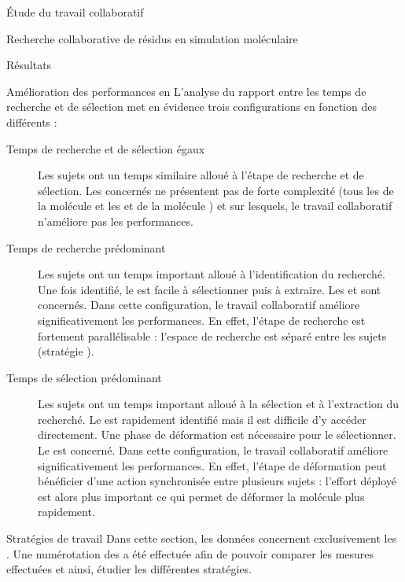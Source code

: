 \documentclass[myfrancais]{mythesis}
\begin{document}
\begin{mypart}{Étude du travail collaboratif}
\begin{mychapter}{Recherche collaborative de résidus en simulation moléculaire}
\begin{mysection}{Résultats}
\begin{mysubsection}{Amélioration des performances en }
					L'analyse du rapport entre les temps de recherche et de sélection met en évidence trois configurations en fonction des différents  :
					\begin{description}
						\item[Temps de recherche et de sélection égaux]
							Les sujets ont un temps similaire alloué à l'étape de recherche et de sélection.
							Les  concernés ne présentent pas de forte complexité (tous les  de la molécule \myTRPCAGE et les   et  de la molécule \myPrion) et sur lesquels, le travail collaboratif n'améliore pas les performances.
						\item[Temps de recherche prédominant]
							Les sujets ont un temps important alloué à l'identification du  recherché.
							Une fois identifié, le  est facile à sélectionner puis à extraire.
							Les   et  sont concernés.
							Dans cette configuration, le travail collaboratif améliore significativement les performances.
							En effet, l'étape de recherche est fortement parallélisable : l'espace de recherche est séparé entre les sujets (stratégie ).
						\item[Temps de sélection prédominant]
							Les sujets ont un temps important alloué à la sélection et à l'extraction du  recherché.
							Le  est rapidement identifié mais il est difficile d'y accéder directement.
							Une phase de déformation est nécessaire pour le sélectionner.
							Le   est concerné.
							Dans cette configuration, le travail collaboratif améliore significativement les performances.
							En effet, l'étape de déformation peut bénéficier d'une action synchronisée entre plusieurs sujets : l'effort déployé est alors plus important ce qui permet de déformer la molécule plus rapidement.
					\end{description}
				\end{mysubsection}
				\begin{mysubsection}{Stratégies de travail}
					Dans cette section, les données concernent exclusivement les .
					Une numérotation des  a été effectuée afin de pouvoir comparer les mesures effectuées et ainsi, étudier les différentes stratégies.


\end{mysubsection}
\end{mysection}
\end{mychapter}
\end{mypart}
\end{document}
